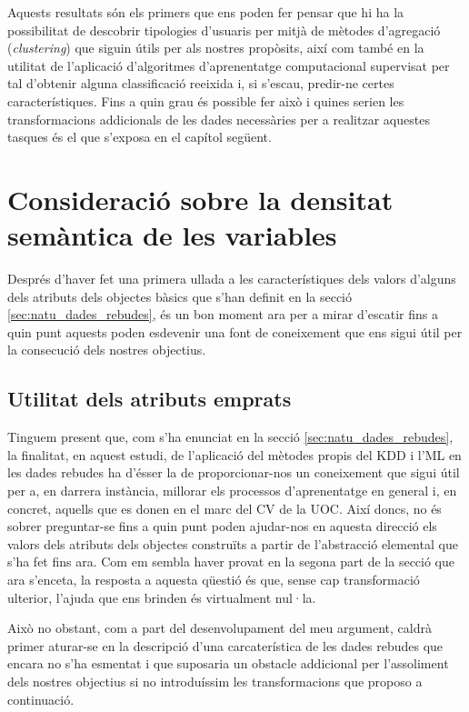 \documentclass[
	a4paper,
	twoside,
	justified
]{tufte-book}
\begin{document}
Aquests resultats són els primers que ens poden fer pensar que hi ha la possibilitat de descobrir tipologies d'usuaris per mitjà de mètodes d'agregació (\emph{clustering}) que siguin útils per als nostres propòsits, així com també en la utilitat de l'aplicació d'algoritmes d'aprenentatge computacional supervisat per tal d'obtenir alguna classificació reeixida i, si s'escau, predir-ne certes característiques. Fins a quin grau és possible fer això i quines serien les transformacions addicionals de les dades necessàries per a realitzar aquestes tasques és el que s'exposa en el capítol següent.   

      
\chapter{Consideració sobre la densitat semàntica de les variables}
\label{chap:metrics_utility}

Després d'haver fet una primera ullada a les característiques dels valors d'alguns dels atributs dels objectes bàsics que s'han definit en la secció \ref{sec:natu_dades_rebudes}, és un bon moment ara per a mirar d'escatir fins a quin punt aquests poden esdevenir una font de coneixement que ens sigui útil per la consecució dels nostres objectius.  

\section{Utilitat dels atributs emprats}
\label{sec:metrics_utility}

Tinguem present que, com s'ha enunciat en la secció \ref{sec:natu_dades_rebudes}, la finalitat, en aquest estudi, de l'aplicació del mètodes propis del KDD i l'ML en les dades rebudes ha d'ésser la de proporcionar-nos un coneixement que sigui útil per a, en darrera instància, millorar els processos d'aprenentatge en general i, en concret, aquells que es donen en el marc del CV de la UOC. Així doncs, no és sobrer preguntar-se fins a quin punt poden ajudar-nos en aquesta direcció els valors dels atributs dels objectes construïts a partir de l'abstracció elemental que s'ha fet fins ara. Com em sembla haver provat en la segona part de la secció que ara s'enceta, la resposta a aquesta qüestió és que,  sense cap transformació ulterior, l'ajuda que ens brinden és virtualment nul·la.

Això no obstant, com a part del desenvolupament del meu argument, caldrà primer aturar-se en la descripció d'una carcaterística de les dades rebudes que encara no s'ha esmentat i que suposaria un obstacle addicional per l'assoliment dels nostres objectius si no introduíssim les transformacions que proposo a continuació.   
\end{document}
